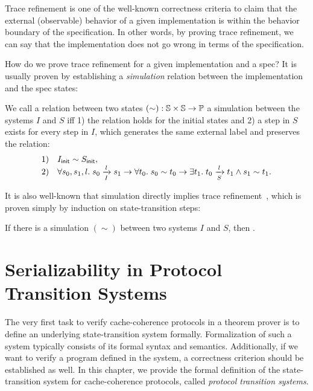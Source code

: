 Trace refinement is one of the well-known correctness criteria to claim that the external (observable) behavior of a given implementation is within the behavior boundary of the specification.
In other words, by proving trace refinement, we can say that the implementation does not go wrong in terms of the specification.

How do we prove trace refinement for a given implementation and a spec?
It is usually proven by establishing a \emph{simulation} relation between the implementation and the spec states:
\begin{definition}[Simulation]
  We call a relation between two states $(\sim): \hstt{} \times \hstt{} \to \propt{}$ a simulation between the systems $I$ and $S$ iff 1) the relation holds for the initial states and 2) a step in $S$ exists for every step in $I$, which generates the same external label and preserves the relation:
  \begin{displaymath}
    \begin{array}{rl}
      1) & \sysInit{I} \sim \sysInit{S},\\
      2) & \forall s_0, s_1, l.\; \semstep{I}{s_0}{l}{s_1} \to \forall t_0.\; s_0 \sim t_0 \to \exists t_1.\; \semstep{S}{t_0}{l}{t_1} \wedge s_1 \sim t_1.
    \end{array}
  \end{displaymath}
\end{definition}

It is also well-known that simulation directly implies trace refinement~\cite{equivalence}, which is proven simply by induction on state-transition steps:
\begin{theorem}
  If there is a simulation $(\sim)$ between two systems $I$ and $S$, then .
\end{theorem}

\chapter{Serializability in Protocol Transition Systems}
\label{sec-sz-def}



The very first task to verify cache-coherence protocols in a theorem prover is to define an underlying state-transition system formally.
Formalization of such a system typically consists of its formal syntax and semantics.
Additionally, if we want to verify a program defined in the system, a correctness criterion should be established as well.
In this chapter, we provide the formal definition of the state-transition system for cache-coherence protocols, called \emph{protocol transition systems}.


